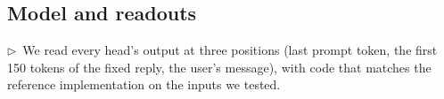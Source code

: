\documentclass[11pt]{article}
\newcommand{\flow}[1]{\par\noindent\textcolor{blue!60!black}{\small$\triangleright$\ #1}\par\medskip}
\begin{document}
\subsection{Model and readouts}
\flow{We read every head's output at three positions (last prompt token, the first 150 tokens of the fixed reply, the user's message), with code that matches the reference implementation on the inputs we tested.}
\end{document}
